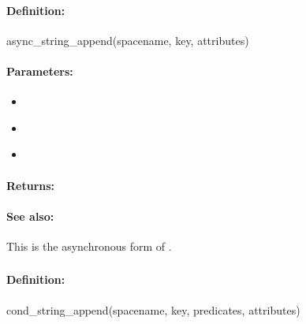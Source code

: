\paragraph{Definition:}
\begin{rubycode}
async_string_append(spacename, key, attributes)
\end{rubycode}

\paragraph{Parameters:}
\begin{itemize}[noitemsep]
\item {}\\

\item {}\\

\item {}\\

\end{itemize}

\paragraph{Returns:}


\paragraph{See also:}  This is the asynchronous form of .

\pagebreak
\subsubsection{}
\label{api:ruby:cond_string_append}


\paragraph{Definition:}
\begin{rubycode}
cond_string_append(spacename, key, predicates, attributes)
\end{rubycode}


